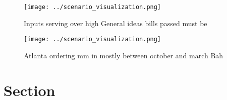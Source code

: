 \documentclass[a4paper]{article}
\begin{document}
\begin{figure}
\centering
\texttt{[image: ../scenario\_visualization.png]}
\caption{Inputs serving over high General ideas bills passed must be
}
\end{figure}
 
\begin{figure}
\centering
\texttt{[image: ../scenario\_visualization.png]}
\caption{Atlanta ordering mm in mostly between october and march Bah
}
\end{figure}
 
\section{Section}
\end{document}
